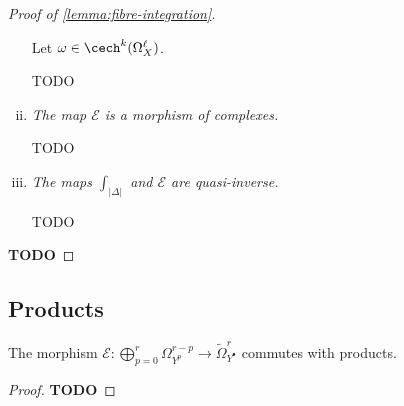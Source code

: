 \begin{proof}[Proof of \cref{lemma:fibre-integration}]
\begin{enumerate}[(i)]
                    Let $\omega\in\cech^k(\Omega_X^\ell)$.

                    {\color{red}TODO}

                \item \emph{The map $\mathscr{E}$ is a morphism of complexes.}

                    {\color{red}TODO}

                \item \emph{The maps $\int_{|\Delta|}$ and $\mathscr{E}$ are quasi-inverse.}

                    {\color{red}TODO}

            \end{enumerate}
            {\color{red}\textbf{TODO}}
        \end{proof}


    \subsection*{Products} %
    \label{sub:products}

        \begin{lemma}
            The morphism $\mathscr{E}\colon\bigoplus_{p=0}^r\Omega_{Y^p}^{r-p}\to\widetilde{\Omega}_{Y^\bullet}^r$ commutes with products.
        \end{lemma}

        \begin{proof}
            {\color{red}\textbf{TODO}}
        \end{proof}


